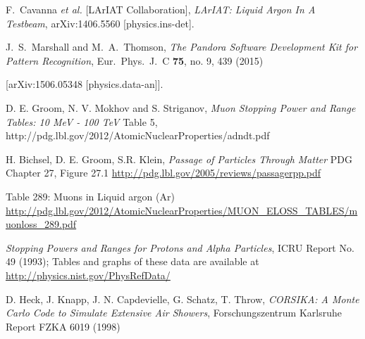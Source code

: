 \documentclass[a4paper,11pt]{article}
\begin{document}
\begin{thebibliography}{99}
  F.~Cavanna {\it et al.} [LArIAT Collaboration],
  \textit{LArIAT: Liquid Argon In A Testbeam},
  arXiv:1406.5560 [physics.ins-det].




  J.~S.~Marshall and M.~A.~Thomson,
  \textit{The Pandora Software Development Kit for Pattern Recognition},
  Eur.\ Phys.\ J.\ C {\bf 75}, no. 9, 439 (2015)

  [arXiv:1506.05348 [physics.data-an]].

  D. E. Groom, N. V. Mokhov and S. Striganov,
  \textit{Muon Stopping Power and Range Tables: 10 MeV - 100 TeV} Table 5,
  http://pdg.lbl.gov/2012/AtomicNuclearProperties/adndt.pdf

  H. Bichsel, D. E. Groom, S.R. Klein, 
  \textit{Passage of Particles Through Matter} PDG Chapter 27, Figure 27.1 \url{http://pdg.lbl.gov/2005/reviews/passagerpp.pdf}

   Table 289: Muons in Liquid argon (Ar) \url{http://pdg.lbl.gov/2012/AtomicNuclearProperties/MUON_ELOSS_TABLES/muonloss_289.pdf}

   \textit{Stopping Powers and Ranges for Protons and Alpha Particles}, ICRU Report No. 49 (1993); Tables and graphs of these data are available at \url{http://physics.nist.gov/PhysRefData/}

   D. Heck, J. Knapp, J. N. Capdevielle, G. Schatz, T. Throw, \textit{CORSIKA: A Monte Carlo Code to Simulate Extensive Air Showers}, Forschungszentrum Karlsruhe Report FZKA 6019 (1998)









\end{thebibliography}
\end{document}
